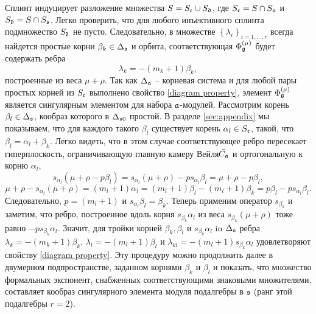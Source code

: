 Сплинт индуцирует разложение множества $S=S_{\frak{c}}\cup S_{\frak{d}}$, где $S_{\frak{c}}=S\cap S_{\mathfrak{a}}$ и $S_{\frak{d}}=S\cap S_{\mathfrak{s}}$.  Легко проверить, что для любого инъективного сплинта подмножество  $S_{\frak{d}}$ не пусто. Следовательно, в множестве $\left\{ \lambda
_{i}\right\} _{i=1,\dots ,r}$ всегда найдется простые корни $\beta_{k}\in \Delta _{\mathfrak{s}}$ и орбита, соответствующая $\Phi _{\mathfrak{g}}^{\left( \mu \right) }$ будет содержать ребра
\begin{equation}
\lambda _{k}=-\left( m_{k}+1\right) \beta _{k}  \label{beta edge},
\end{equation}
построенные из веса  $\mu +\rho $.  Так как $\Delta _{\mathfrak{a}}$ -- корневая система и для любой пары простых корней из $S_{\frak{c}}$ выполнено свойство \ref{diagram property}, элемент  $\Phi _{\mathfrak{g}}^{\left( \mu \right) }$ является сингулярным элементом для набора  $\mathfrak{a}$-модулей. Рассмотрим корень $\beta _{l}\in \Delta _{\mathfrak{s}}$, кообраз которого в  $\Delta _{\mathfrak{s}0}$  простой. В разделе \ref{sec:appendix} мы показываем, что для каждого такого $\beta _{l}$ существует корень  $\alpha _{l}\in S_{\frak{c}}$, такой, что $\beta _{l}=\alpha _{l}+\beta _{k}$. Легко видеть, что в этом случае соответствующее ребро пересекает гиперплоскость, ограничивающую главную камеру Вейля$ \bar{C_{\mathfrak{a}}}$ и ортогональную к корню $\alpha _{l}$,
\begin{equation}
s_{\alpha _{l}}\left( \mu +\rho -p\beta _{l}\right) =s_{\alpha _{l}}\left(
\mu +\rho \right) -ps_{\alpha _{l}}\beta _{l}=\mu +\rho -p\beta _{l},
\label{intersection}
\end{equation}
\begin{equation}
\mu +\rho -s_{\alpha _{l}}\left( \mu +\rho \right) =\left( m_{l}+1\right)
\alpha _{l}=\left( m_{l}+1\right) \beta _{l}-\left( m_{l}+1\right) \beta
_{k}=p\beta _{l}-ps_{\alpha _{l}}\beta _{l}.  
\label{intersection-2}
\end{equation}
Следовательно,  $p=\left( m_{l}+1\right) $ и  $s_{\alpha _{l}}\beta_{l}=\beta _{k}$. Теперь применим оператор $s_{\beta _{k}}$ и заметим, что ребро, построенное вдоль корня $s_{\beta _{k}}\alpha _{l}$ из веса $s_{\beta _{k}}(\mu +\rho )$ тоже равно $-ps_{\beta _{k}}\alpha _{l}$. Значит, для тройки корней  $\beta _{k},\beta _{l}$ и $s_{\beta _{k}}\alpha _{l}$ in $\Delta _{\mathfrak{s}}$ ребра $\lambda_{k}=-\left( m_{k}+1\right) \beta _{k}$, $\lambda _{l}=-\left(m_{l}+1\right) \beta _{l}$ и $\lambda _{kl}=-\left( m_{l}+1\right)s_{\beta _{k}}\alpha _{l}$ удовлетворяют свойству \ref{diagram property}.
Эту процедуру можно продолжить далее в двумерном подпространстве, заданном корнями $\beta _{k}$ и $\beta _{l}$ и показать, что множество формальных экспонент, снабженных соответствующими знаковыми множителями, составляет кообраз сингулярного элемента модуля подалгебры в  $\frak{
s}$ (ранг этой подалгебры $r=2$).

